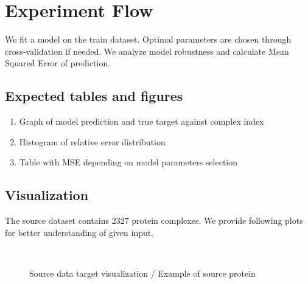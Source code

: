 \section{Experiment Flow}
We fit a model on the train dataset. Optimal parameters are chosen through cross-validation if needed. We analyze model robustness and calculate Mean Squared Error of prediction. \
\subsection{Expected tables and figures}
\begin{enumerate}
    \item Graph of model prediction and true target against complex index
    \item Histogram of relative error distribution
    \item Table with MSE depending on model parameters selection
\end{enumerate}
\subsection{Visualization}
The source dataset contains 2327 protein complexes. We provide following plots for better understanding of given input.
\begin{figure}[!ht]
  \\
 \caption{Source data target visualization / Example of source protein}
  \label{fig:3}
\end{figure}